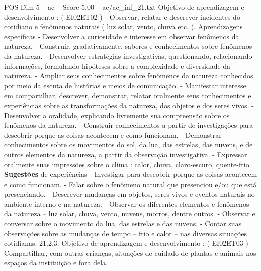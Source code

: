 \begin{textsample}{POS Dim 5 – ac – Score 5.00 – ac/ac\_inf\_21.txt}
Objetivo de aprendizagem e desenvolvimento : ( EI02ET02 ) - Observar, relatar e descrever incidentes do cotidiano e fenômenos naturais ( luz solar, vento, chuva etc. ).
Aprendizagens específicas - Desenvolver a curiosidade e interesse em observar fenômenos da natureza. - Construir, gradativamente, saberes e conhecimentos sobre fenômenos da natureza. - Desenvolver estratégias investigativas, questionando, relacionando informações, formulando hipóteses sobre a complexidade e diversidade da natureza. - Ampliar seus conhecimentos sobre fenômenos da natureza conhecidos por meio da escuta de histórias e meios de comunicação. - Manifestar interesse em compartilhar, descrever, demonstrar, relatar oralmente seus conhecimentos e experiências sobre as transformações da natureza, dos objetos e dos seres vivos. - Desenvolver a oralidade, explicando livremente sua compreensão sobre os fenômenos da natureza. - Construir conhecimentos a partir de investigações para descobrir porque as coisas acontecem e como funcionam. - Demonstrar conhecimentos sobre os movimentos do sol, da lua, das estrelas, das nuvens, e de outros elementos da natureza, a partir da observação investigativa. - Expressar oralmente suas impressões sobre o clima : calor, chuva, claro-escuro, quente-frio. \textbf{Sugestões} de experiências - Investigar para descobrir porque as coisas acontecem e como funcionam. - Falar sobre o fenômeno natural que presenciou e/ou que está presenciando. - Descrever mudanças em objetos, seres vivos e eventos naturais no ambiente interno e na natureza. - Observar os diferentes elementos e fenômenos da natureza – luz solar, chuva, vento, nuvens, morros, dentre outros. - Observar e conversar sobre o movimento da lua, das estrelas e das nuvens. - Contar suas observações sobre as mudanças de tempo – frio e calor – nas diversas situações cotidianas. 21.2.3.
Objetivo de aprendizagem e desenvolvimento : ( EI02ET03 ) - Compartilhar, com outras crianças, situações de cuidado de plantas e animais nos espaços da instituição e fora dela.

\end{textsample}
